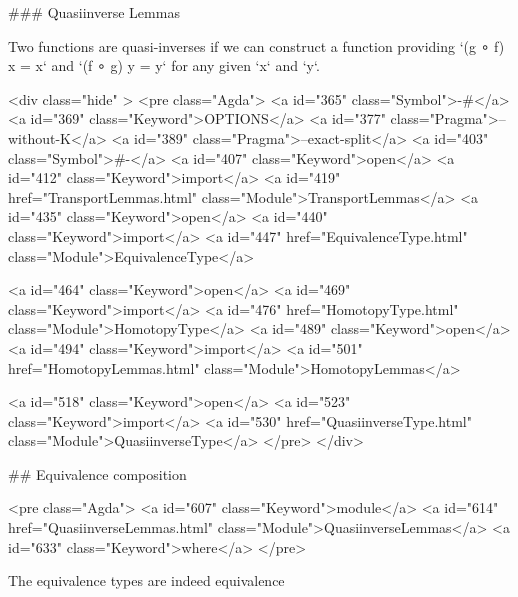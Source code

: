   ### Quasiinverse Lemmas

Two functions are quasi-inverses if we can construct a function providing
`(g ∘ f) x = x` and `(f ∘ g) y = y` for any given `x` and `y`.

<div class="hide" >
<pre class="Agda">
<a id="365" class="Symbol">{-#</a> <a id="369" class="Keyword">OPTIONS</a> <a id="377" class="Pragma">--without-K</a> <a id="389" class="Pragma">--exact-split</a> <a id="403" class="Symbol">#-}</a>
<a id="407" class="Keyword">open</a> <a id="412" class="Keyword">import</a> <a id="419" href="TransportLemmas.html" class="Module">TransportLemmas</a>
<a id="435" class="Keyword">open</a> <a id="440" class="Keyword">import</a> <a id="447" href="EquivalenceType.html" class="Module">EquivalenceType</a>

<a id="464" class="Keyword">open</a> <a id="469" class="Keyword">import</a> <a id="476" href="HomotopyType.html" class="Module">HomotopyType</a>
<a id="489" class="Keyword">open</a> <a id="494" class="Keyword">import</a> <a id="501" href="HomotopyLemmas.html" class="Module">HomotopyLemmas</a>


<a id="518" class="Keyword">open</a> <a id="523" class="Keyword">import</a> <a id="530" href="QuasiinverseType.html" class="Module">QuasiinverseType</a>
</pre>
</div>

## Equivalence composition

<pre class="Agda">
<a id="607" class="Keyword">module</a> <a id="614" href="QuasiinverseLemmas.html" class="Module">QuasiinverseLemmas</a> <a id="633" class="Keyword">where</a>
</pre>

The equivalence types are indeed equivalence

